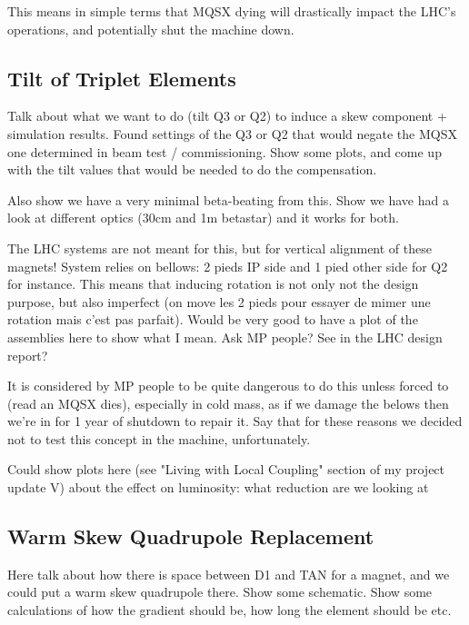 This means in simple terms that MQSX dying will drastically impact the LHC's operations, and potentially shut the machine down.

\subsection{Tilt of Triplet Elements}

Talk about what we want to do (tilt Q3 or Q2) to induce a skew component + simulation results.
Found settings of the Q3 or Q2 that would negate the MQSX one determined in beam test / commissioning.
Show some plots, and come up with the tilt values that would be needed to do the compensation.

Also show we have a very minimal beta-beating from this.
Show we have had a look at different optics (30cm and 1m betastar) and it works for both.


The LHC systems are not meant for this, but for vertical alignment of these magnets!
System relies on bellows: 2 pieds IP side and 1 pied other side for Q2 for instance.
This means that inducing rotation is not only not the design purpose, but also imperfect (on move les 2 pieds pour essayer de mimer une rotation mais c'est pas parfait).
Would be very good to have a plot of the assemblies here to show what I mean. Ask MP people? See in the LHC design report?

It is considered by MP people to be quite dangerous to do this unless forced to (read an MQSX dies), especially in cold mass, as if we damage the belows then we're in for 1 year of shutdown to repair it.
Say that for these reasons we decided not to test this concept in the machine, unfortunately.

Could show plots here (see "Living with Local Coupling" section of my project update V) about the effect on luminosity: what reduction are we looking at 

\subsection{Warm Skew Quadrupole Replacement}

Here talk about how there is space between D1 and TAN for a magnet, and we could put a warm skew quadrupole there.
Show some schematic.
Show some calculations of how the gradient should be, how long the element should be etc.

